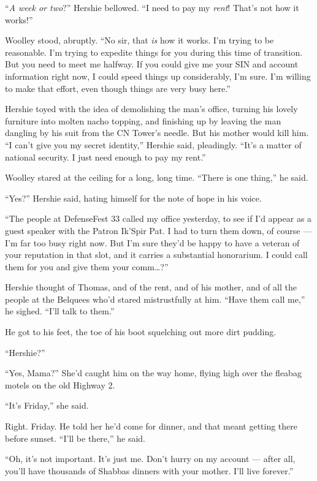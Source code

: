 ``\emph{A week or two}?'' Hershie bellowed.
``I need to pay my \emph{rent}! That's not how it works!''

Woolley stood, abruptly.
``No sir, that \emph{is} how it works. I'm trying to be reasonable. I'm trying 
to expedite things for you during this time of transition. But you need to meet 
me halfway. If you could give me your SIN and account information right now, I 
could speed things up considerably, I'm sure. I'm willing to make that effort, 
even though things are very busy here.''

Hershie toyed with the idea of demolishing the man's office,
turning his lovely furniture into molten nacho topping, and
finishing up by leaving the man dangling by his suit from the CN
Tower's needle. But his mother would kill him.
``I can't give you my secret identity,'' Hershie said, pleadingly.
``It's a matter of national security. I just need enough to pay my rent.''

Woolley stared at the ceiling for a long, long time.
``There is one thing,'' he said.

``Yes?'' Hershie said, hating himself for the note of hope in his
voice.

``The people at DefenseFest 33 called my office yesterday, to see if I'd appear 
as a guest speaker with the Patron Ik'Spir Pat. I had to turn them down, of 
course --- I'm far too busy right now. But I'm sure they'd be happy to have a 
veteran of your reputation in that slot, and it carries a substantial 
honorarium. I could call them for you and give them your comm\ldots{}?''

Hershie thought of Thomas, and of the rent, and of his mother, and
of all the people at the Belquees who'd stared mistrustfully at
him. ``Have them call me,'' he sighed. ``I'll talk to them.''

He got to his feet, the toe of his boot squelching out more dirt
pudding.

\tb

``Hershie?''

``Yes, Mama?'' She'd caught him on the way home, flying high over
the fleabag motels on the old Highway 2.

``It's Friday,'' she said.

Right. Friday. He told her he'd come for dinner, and that meant
getting there before sunset. ``I'll be there,'' he said.

``Oh, it's not important. It's just me. Don't hurry on my account --- after 
all, you'll have thousands of Shabbas dinners with your mother. I'll live 
forever.''

